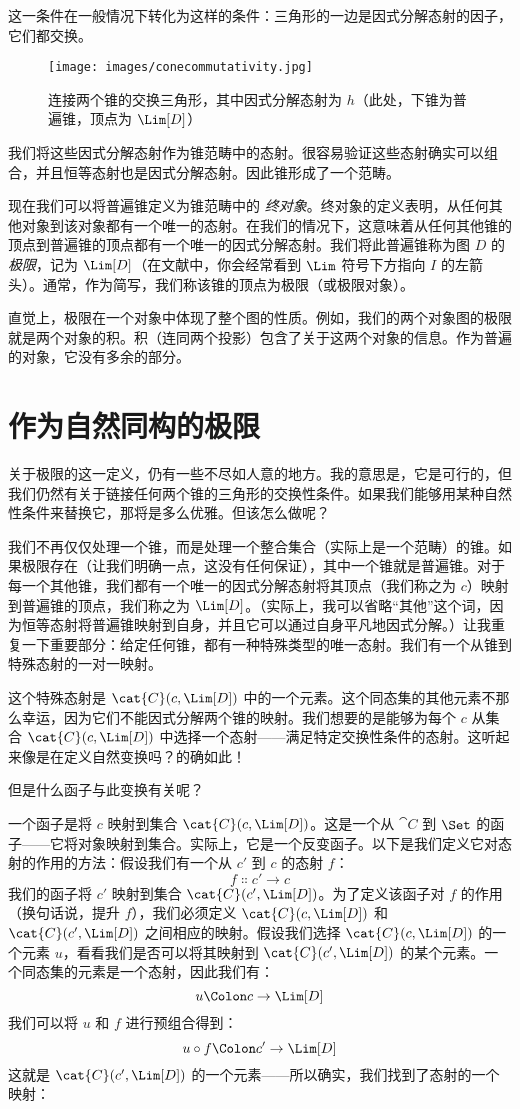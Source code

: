 这一条件在一般情况下转化为这样的条件：三角形的一边是因式分解态射的因子，它们都交换。

\begin{figure}[H]
  \centering
  \texttt{[image: images/conecommutativity.jpg]}
  \caption{连接两个锥的交换三角形，其中因式分解态射为 $h$（此处，下锥为普遍锥，顶点为 $\Lim[D]$）}
\end{figure}

\noindent
我们将这些因式分解态射作为锥范畴中的态射。很容易验证这些态射确实可以组合，并且恒等态射也是因式分解态射。因此锥形成了一个范畴。

现在我们可以将普遍锥定义为锥范畴中的 \emph{终对象}。终对象的定义表明，从任何其他对象到该对象都有一个唯一的态射。在我们的情况下，这意味着从任何其他锥的顶点到普遍锥的顶点都有一个唯一的因式分解态射。我们将此普遍锥称为图 $D$ 的 \emph{极限}，记为 $\Lim[D]$（在文献中，你会经常看到 $\Lim$ 符号下方指向 $I$ 的左箭头）。通常，作为简写，我们称该锥的顶点为极限（或极限对象）。

直觉上，极限在一个对象中体现了整个图的性质。例如，我们的两个对象图的极限就是两个对象的积。积（连同两个投影）包含了关于这两个对象的信息。作为普遍的对象，它没有多余的部分。

\section{作为自然同构的极限}

关于极限的这一定义，仍有一些不尽如人意的地方。我的意思是，它是可行的，但我们仍然有关于链接任何两个锥的三角形的交换性条件。如果我们能够用某种自然性条件来替换它，那将是多么优雅。但该怎么做呢？

我们不再仅仅处理一个锥，而是处理一个整合集合（实际上是一个范畴）的锥。如果极限存在（让我们明确一点，这没有任何保证），其中一个锥就是普遍锥。对于每一个其他锥，我们都有一个唯一的因式分解态射将其顶点（我们称之为 $c$）映射到普遍锥的顶点，我们称之为 $\Lim[D]$。（实际上，我可以省略“其他”这个词，因为恒等态射将普遍锥映射到自身，并且它可以通过自身平凡地因式分解。）让我重复一下重要部分：给定任何锥，都有一种特殊类型的唯一态射。我们有一个从锥到特殊态射的一对一映射。

这个特殊态射是 $\cat{C}(c, \Lim[D])$ 中的一个元素。这个同态集的其他元素不那么幸运，因为它们不能因式分解两个锥的映射。我们想要的是能够为每个 $c$ 从集合 $\cat{C}(c, \Lim[D])$ 中选择一个态射——满足特定交换性条件的态射。这听起来像是在定义自然变换吗？的确如此！

但是什么函子与此变换有关呢？

一个函子是将 $c$ 映射到集合 $\cat{C}(c, \Lim[D])$。这是一个从 $\cat{C}$ 到 $\Set$ 的函子——它将对象映射到集合。实际上，它是一个反变函子。以下是我们定义它对态射的作用的方法：假设我们有一个从 $c'$ 到 $c$ 的态射 $f$：
\[f \Colon c' \to c\]
我们的函子将 $c'$ 映射到集合 $\cat{C}(c', \Lim[D])$。为了定义该函子对 $f$ 的作用（换句话说，提升 $f$），我们必须定义 $\cat{C}(c, \Lim[D])$ 和 $\cat{C}(c', \Lim[D])$ 之间相应的映射。假设我们选择 $\cat{C}(c, \Lim[D])$ 的一个元素 $u$，看看我们是否可以将其映射到 $\cat{C}(c', \Lim[D])$ 的某个元素。一个同态集的元素是一个态射，因此我们有：
\[u \Colon c \to \Lim[D]\]
我们可以将 $u$ 和 $f$ 进行预组合得到：
\[u \circ f \Colon c' \to \Lim[D]\]
这就是 $\cat{C}(c', \Lim[D])$ 的一个元素——所以确实，我们找到了态射的一个映射：

